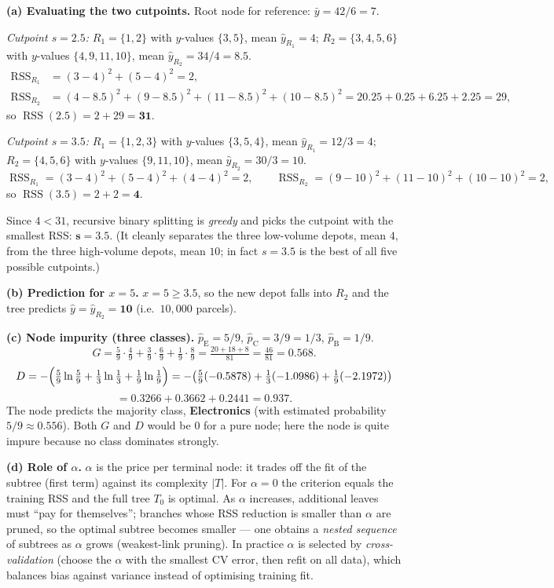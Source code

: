 \documentclass[11pt,a4paper]{article}
\begin{document}
\ifdefined\withsolutions
\begin{solutionbox}
\textbf{(a) Evaluating the two cutpoints.}
Root node for reference: $\bar{y}=42/6=7$.

\emph{Cutpoint $s=2.5$:} $R_1=\{1,2\}$ with $y$-values $\{3,5\}$, mean $\hat{y}_{R_1}=4$;
$R_2=\{3,4,5,6\}$ with $y$-values $\{4,9,11,10\}$, mean $\hat{y}_{R_2}=34/4=8.5$.
\begin{align*}
  \operatorname{RSS}_{R_1}&=(3-4)^2+(5-4)^2=2,\\
  \operatorname{RSS}_{R_2}&=(4-8.5)^2+(9-8.5)^2+(11-8.5)^2+(10-8.5)^2=20.25+0.25+6.25+2.25=29,
\end{align*}
so $\operatorname{RSS}(2.5)=2+29=\mathbf{31}$.

\emph{Cutpoint $s=3.5$:} $R_1=\{1,2,3\}$ with $y$-values $\{3,5,4\}$, mean
$\hat{y}_{R_1}=12/3=4$; $R_2=\{4,5,6\}$ with $y$-values $\{9,11,10\}$, mean
$\hat{y}_{R_2}=30/3=10$.
\[
  \operatorname{RSS}_{R_1}=(3-4)^2+(5-4)^2+(4-4)^2=2,\qquad
  \operatorname{RSS}_{R_2}=(9-10)^2+(11-10)^2+(10-10)^2=2,
\]
so $\operatorname{RSS}(3.5)=2+2=\mathbf{4}$.

Since $4<31$, recursive binary splitting is \emph{greedy} and picks the cutpoint with the
smallest RSS: $\mathbf{s=3.5}$. (It cleanly separates the three low-volume depots, mean $4$,
from the three high-volume depots, mean $10$; in fact $s=3.5$ is the best of all five possible
cutpoints.)

\medskip
\textbf{(b) Prediction for $x=5$.}
$x=5\ge 3.5$, so the new depot falls into $R_2$ and the tree predicts
$\hat{y}=\hat{y}_{R_2}=\mathbf{10}$ (i.e.\ $10{,}000$ parcels).

\medskip
\textbf{(c) Node impurity (three classes).}
$\hat{p}_{\text{E}}=5/9$, $\hat{p}_{\text{C}}=3/9=1/3$, $\hat{p}_{\text{B}}=1/9$.
\[
  G=\tfrac{5}{9}\cdot\tfrac{4}{9}+\tfrac{3}{9}\cdot\tfrac{6}{9}+\tfrac{1}{9}\cdot\tfrac{8}{9}
   =\tfrac{20+18+8}{81}=\tfrac{46}{81}=\mathbf{0.568}.
\]
\[
  D=-\Bigl(\tfrac{5}{9}\ln\tfrac{5}{9}+\tfrac{1}{3}\ln\tfrac{1}{3}+\tfrac{1}{9}\ln\tfrac{1}{9}\Bigr)
   =-\bigl(\tfrac{5}{9}(-0.5878)+\tfrac{1}{3}(-1.0986)+\tfrac{1}{9}(-2.1972)\bigr)
\]
\[
   =0.3266+0.3662+0.2441=\mathbf{0.937}.
\]
The node predicts the majority class, \textbf{Electronics} (with estimated probability
$5/9\approx 0.556$). Both $G$ and $D$ would be $0$ for a pure node; here the node is quite
impure because no class dominates strongly.

\medskip
\textbf{(d) Role of $\alpha$.}
$\alpha$ is the price per terminal node: it trades off the fit of the subtree (first term)
against its complexity $|T|$.
For $\alpha=0$ the criterion equals the training RSS and the full tree $T_0$ is optimal.
As $\alpha$ increases, additional leaves must ``pay for themselves''; branches whose RSS
reduction is smaller than $\alpha$ are pruned, so the optimal subtree becomes smaller ---
one obtains a \emph{nested sequence} of subtrees as $\alpha$ grows (weakest-link pruning).
In practice $\alpha$ is selected by \emph{cross-validation} (choose the $\alpha$ with the
smallest CV error, then refit on all data), which balances bias against variance instead of
optimising training fit.
\end{solutionbox}
\fi
\end{document}
